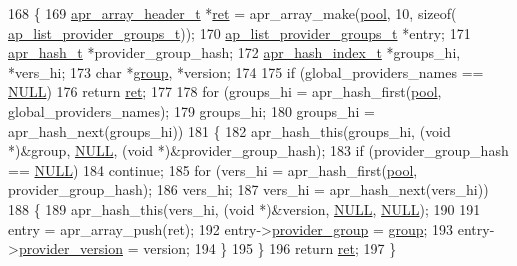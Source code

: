 \begin{DoxyCode}
168 \{
169     \hyperlink{structapr__array__header__t}{apr\_array\_header\_t} *\hyperlink{group__APACHE__MPM_ga794c48ec324a4d85a40f38fe264d2a41}{ret} = apr\_array\_make(\hyperlink{group__APACHE__CORE__MUTEX_ga8fea43b485988aa6df5dced9dddbe733}{pool}, 10, \textcolor{keyword}{sizeof}(
      \hyperlink{structap__list__provider__groups__t}{ap\_list\_provider\_groups\_t}));
170     \hyperlink{structap__list__provider__groups__t}{ap\_list\_provider\_groups\_t} *entry;
171     \hyperlink{structapr__hash__t}{apr\_hash\_t} *provider\_group\_hash;
172     \hyperlink{structapr__hash__index__t}{apr\_hash\_index\_t} *groups\_hi, *vers\_hi;
173     \textcolor{keywordtype}{char} *\hyperlink{group__MOD__DAV_gadc3add9d56a1a732c371606682db4c4e}{group}, *version;
174 
175     \textcolor{keywordflow}{if} (global\_providers\_names == \hyperlink{pcre_8txt_ad7f989d16aa8ca809a36bc392c07fba1}{NULL})
176         \textcolor{keywordflow}{return} \hyperlink{group__APACHE__MPM_ga794c48ec324a4d85a40f38fe264d2a41}{ret};
177 
178     \textcolor{keywordflow}{for} (groups\_hi = apr\_hash\_first(\hyperlink{group__APACHE__CORE__MUTEX_ga8fea43b485988aa6df5dced9dddbe733}{pool}, global\_providers\_names);
179          groups\_hi;
180          groups\_hi = apr\_hash\_next(groups\_hi))
181     \{
182         apr\_hash\_this(groups\_hi, (\textcolor{keywordtype}{void} *)&group, \hyperlink{pcre_8txt_ad7f989d16aa8ca809a36bc392c07fba1}{NULL}, (\textcolor{keywordtype}{void} *)&provider\_group\_hash);
183         \textcolor{keywordflow}{if} (provider\_group\_hash == \hyperlink{pcre_8txt_ad7f989d16aa8ca809a36bc392c07fba1}{NULL})
184             \textcolor{keywordflow}{continue};
185         \textcolor{keywordflow}{for} (vers\_hi = apr\_hash\_first(\hyperlink{group__APACHE__CORE__MUTEX_ga8fea43b485988aa6df5dced9dddbe733}{pool}, provider\_group\_hash);
186              vers\_hi;
187              vers\_hi = apr\_hash\_next(vers\_hi))
188         \{
189             apr\_hash\_this(vers\_hi, (\textcolor{keywordtype}{void} *)&version, \hyperlink{pcre_8txt_ad7f989d16aa8ca809a36bc392c07fba1}{NULL}, \hyperlink{pcre_8txt_ad7f989d16aa8ca809a36bc392c07fba1}{NULL});
190 
191             entry = apr\_array\_push(ret);
192             entry->\hyperlink{structap__list__provider__groups__t_a2979467749225ed6e657db303eeaeb66}{provider\_group} = \hyperlink{group__MOD__DAV_gadc3add9d56a1a732c371606682db4c4e}{group};
193             entry->\hyperlink{structap__list__provider__groups__t_aa116a4ece1c406a370fadd0c94f84cf8}{provider\_version} = version;
194         \}
195     \}
196     \textcolor{keywordflow}{return} \hyperlink{group__APACHE__MPM_ga794c48ec324a4d85a40f38fe264d2a41}{ret};
197 \}
\end{DoxyCode}


